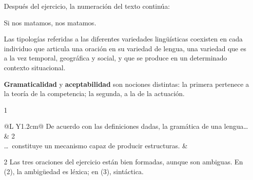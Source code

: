 Después del ejercicio, la numeración del texto continúa:

\begin{exe}
  \ex Si nos matamos, nos matamos.
\end{exe}

\begin{recuadro}
Las tipologías referidas a las diferentes variedades lingüísticas coexisten en
cada individuo que articula una oración en su variedad de lengua, una variedad
que es a la vez temporal, geográfica y social, y que se produce en un
determinado contexto situacional.
\end{recuadro}

\begin{destacado}
\textbf{Gramaticalidad} y \textbf{aceptabilidad} son nociones distintas: la
primera pertenece a la teoría de la competencia; la segunda, a la de la
actuación.
\end{destacado}

\lecturasrecomendadas

\solucionario

\begin{solucion}{1}
\begin{tabularx}{\linewidth}{@{}L Y{1.2cm}@{}}
  \toprule
  De acuerdo con las definiciones dadas, la gramática de una lengua\ldots & 2 \\
  \midrule
  \ldots\ constituye un mecanismo capaz de producir estructuras. & \textbf{\mas} \\
  \bottomrule
\end{tabularx}
\end{solucion}

\begin{solucion}{2}
Las tres oraciones del ejercicio están bien formadas, aunque son ambiguas. En
(2), la ambigüedad es léxica; en (3), sintáctica.
\end{solucion}

